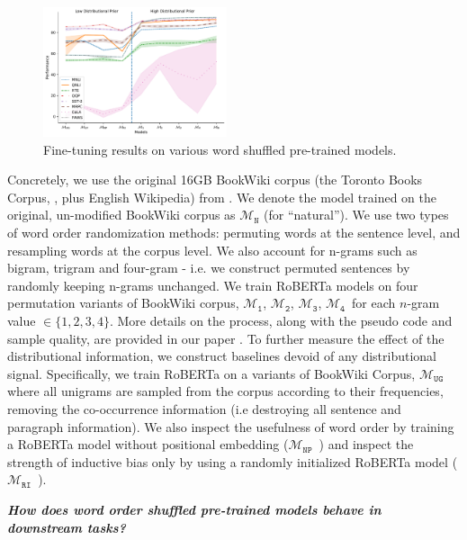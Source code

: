 \documentclass[12pt]{article}
\newcommand{\xit}[1]{{\noindent\textbf{\textit{#1}}}}
\newcommand{\OR}{$\mathcal{M}_{\texttt{N}}$}
\newcommand{\RI}{$\mathcal{M}_{\texttt{1}}$}
\newcommand{\RII}{$\mathcal{M}_{\texttt{2}}$}
\newcommand{\RIII}{$\mathcal{M}_{\texttt{3}}$}
\newcommand{\RIV}{$\mathcal{M}_{\texttt{4}}$}
\newcommand{\RC}{$\mathcal{M}_{\texttt{UG}}$}
\newcommand{\RT}{$\mathcal{M}_{\texttt{RI}}$}
\newcommand{\NP}{$\mathcal{M}_{\texttt{NP}}$}
\begin{document}
\begin{figure}
\vspace{-20pt}
\begin{center}
  \includegraphics[width=0.48\textwidth]{images/masked_result.pdf}
\end{center}
\caption{Fine-tuning results on various word shuffled pre-trained models.}
\label{fig:masked_results}
\end{figure}

Concretely, we use the original 16GB BookWiki corpus (the Toronto Books Corpus, \cite{zhu2015aligning}, plus English Wikipedia) from \cite{liu2019b}. We denote the model trained on the original, un-modified BookWiki corpus as \OR{} (for ``natural''). We use two types of word order randomization methods: permuting words at the sentence level, and resampling words at the corpus level. We also account for n-grams such as bigram, trigram and four-gram - i.e. we construct permuted sentences by randomly keeping n-grams unchanged. We train RoBERTa models on four permutation variants of BookWiki corpus, \RI, \RII, \RIII, \RIV\ for each $n$-gram value $ \in {\{1,2,3,4\}}$. More details on the process, along with the pseudo code and sample quality, are provided in our paper \cite{sinha2021a}. To further measure the effect of the distributional information, we construct baselines devoid of any distributional signal. Specifically, we train RoBERTa on a variants of BookWiki Corpus, \RC\, where all unigrams are sampled from the corpus according to their frequencies, removing the co-occurrence information (i.e destroying all sentence and paragraph information). We also inspect the usefulness of word order by training a RoBERTa model without positional embedding (\NP\ ) and inspect the strength of inductive bias only by using a randomly initialized RoBERTa model (\RT\ ).

\blankline

\xit{How does word order shuffled pre-trained models behave in downstream tasks?}
\end{document}

